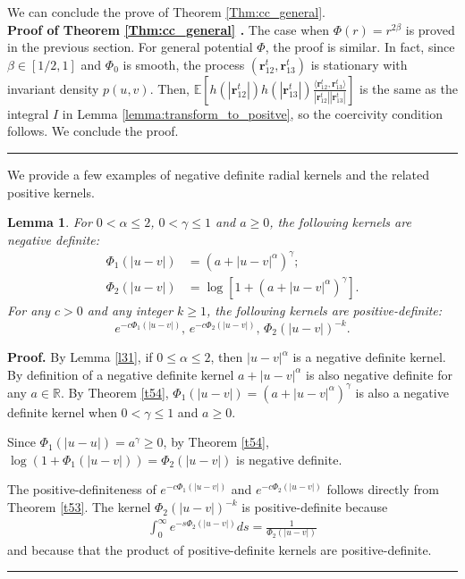 \documentclass[]{elsarticle}
\def\E{\mathbb{E}}
\newcommand{\mbf}[1]{\boldsymbol{#1}}
\newcommand{\innerp}[2]{\langle #1,#2 \rangle}
\newcommand{\br}{\mbf{r}}
\newtheorem{lemma}[theorem]{Lemma}
\newenvironment{proof}[1][Proof]{\noindent\textbf{#1.} }{\ \rule{0.5em}{0.5em}}
\numberwithin{equation}{section}
\numberwithin{theorem}{section}
\newcommand\RR{{\mathbb R}}
\begin{document}
\bigskip
We can conclude the prove of Theorem  \ref{Thm:cc_general}. \\
\begin{proof}[Proof of Theorem \ref{Thm:cc_general} ] The case when $\Phi(r) = r^{2\beta}$ is proved in the previous section. 
For general potential $\Phi$, the proof is similar. In fact, since $\beta\in[1/2,1]$ and $\Phi_0$ is smooth, the process $(\br_{12}^t,\br_{13}^t)$ is stationary with invariant density $p(u,v)$.  Then, $\E[h(|\br_{12}^t|)h(|\br_{13}^t|)\frac{\innerp{\br_{12}^t}{\br_{13}^t}}{|\br_{12}^t||\br_{13}^t|}]$ is the same as the integral $I$ in Lemma \ref{lemma:transform_to_positve}, so the coercivity condition follows. We conclude the proof.  
\end{proof}

\bigskip
We provide a few examples of negative definite radial kernels and the related positive kernels.
\begin{lemma}\label{lem:examplesND}
For $0<\alpha\leq 2$, $0<\gamma\leq 1$ and $a\geq 0$, the following kernels are negative definite: 
\begin{align*}
\Phi_1(|u-v|) &= (a+|u-v|^{\alpha})^{\gamma};\\
\Phi_2(|u-v|) &= \log [1+ (a+|u-v|^{\alpha})^{\gamma}].
\end{align*}
For any $c>0$ and any integer $k\geq 1$, the following kernels are positive-definite: 
\[ e^{-c\Phi_1(|u-v|)}, \, e^{-c \Phi_2(|u-v|)},\, \Phi_2(|u-v|)^{-k}. \]

\end{lemma}

\begin{proof}By Lemma \ref{l31}, if $0\leq \alpha \leq 2$, then $|u-v|^{\alpha}$ is a negative definite kernel. By definition of a negative definite kernel $a+|u-v|^{\alpha}$ is also negative definite for any $a\in \RR$. 
By Theorem \ref{t54}, $\Phi_1(|u-v|) = (a+|u-v|^{\alpha})^{\gamma}$ is also a negative definite kernel when $0<\gamma\leq 1$ and $a\geq 0$. 

Since $\Phi_1(|u-u|)=a^{\gamma}\geq 0$, by Theorem \ref{t54}, $\log(1+\Phi_1(|u-v|))=\Phi_2(|u-v|)$ is negative definite.

The positive-definiteness of $e^{-c\Phi_1(|u-v|)}$ and  $e^{-c \Phi_2(|u-v|)}$ follows directly from Theorem \ref{t53}. 
The kernel $ \Phi_2(|u-v|)^{-k}$ is positive-definite because 
\begin{eqnarray*}
\int_{0}^{\infty}e^{-s \Phi_2(|u-v|) }  ds =\frac{1}{ \Phi_2(|u-v|)}
\end{eqnarray*}
and because that the product of positive-definite kernels are positive-definite. 
\end{proof}
\end{document}
